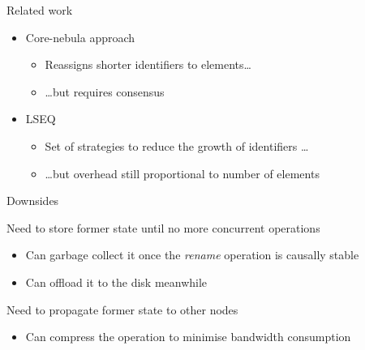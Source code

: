 \documentclass[10pt]{beamer}
\begin{document}
\begin{frame}{Related work}
  \begin{itemize}
    \item Core-nebula approach 
    \begin{itemize}
      \item Reassigns shorter identifiers to elements\dots
      \item \dots but requires consensus
    \end{itemize}
    \item LSEQ 
    \begin{itemize}
      \item Set of strategies to reduce the growth of identifiers \dots
      \item \dots but overhead still proportional to number of elements
    \end{itemize}
  \end{itemize}
\end{frame}

\begin{frame}{Downsides}
  \begin{block}{Need to store former state until no more concurrent operations}
    \begin{itemize}
      \item Can garbage collect it once the \emph{rename} operation is causally stable 
      \item Can offload it to the disk meanwhile
    \end{itemize}
  \end{block}

  \begin{block}{Need to propagate former state to other nodes}
    \begin{itemize}
      \item Can compress the operation to minimise bandwidth consumption
    \end{itemize}
  \end{block}
\end{frame}
\end{document}

